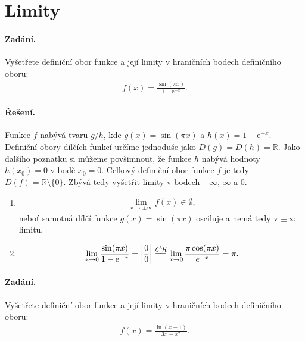 \documentclass[a4paper,11pt]{article}
\begin{document}
	
	\section{Limity}
	
	\paragraph*{Zadání.} Vyšetřete definiční obor funkce a její limity v hraničních bodech definičního oboru:
	\begin{align*}
		f(x) = \frac{\sin(\pi x)}{1 - \mathrm e^{-x}}.
	\end{align*}
	
	\paragraph*{Řešení.} Funkce $f$ nabývá tvaru $g/h$, kde $g(x) = \sin(\pi x)$ a $h(x) = 1-\mathrm e^{-x}$. Definiční obory dílčích funkcí určíme jednoduše jako $D(g) = D(h) = \mathbb R$. Jako dalšího poznatku si můžeme povšimnout, že funkce $h$ nabývá hodnoty $h(x_0) = 0$ v bodě $x_0 = 0$. Celkový definiční obor funkce $f$ je tedy $D(f) = \mathbb R \setminus \{0\}$. Zbývá tedy vyšetřit limity v bodech $-\infty, \, \infty$ a $0$.
	\begin{enumerate}[label=(\alph*)]
		\item \begin{align*}
			\lim_{x \to \pm\infty} f(x) \in \emptyset,
		\end{align*}
		neboť samotná dílčí funkce $g(x) = \sin(\pi x)$ osciluje a nemá tedy v $\pm\infty$ limitu.
		
		\item \begin{align*}
			\lim_{x \to 0} \frac{\sin(\pi x)}{1 - \mathrm e^{-x}} = \bigg| \frac 00 \bigg| \overset{\mathcal{L'H}}{=\joinrel=} \lim_{x \to 0} \frac{\pi \cos(\pi x)}{e^{-x}} = \pi.
		\end{align*}
	\end{enumerate}
	
	\paragraph*{Zadání.} Vyšetřete definiční obor funkce a její limity v hraničních bodech definičního oboru:
	\begin{align*}
		f(x) = \frac{\ln(x-1)}{3x-x^2}.
	\end{align*}
	
\end{document}
